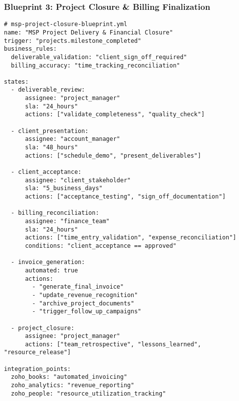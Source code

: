 \subsubsection{Blueprint 3: Project Closure \& Billing Finalization}
\begin{verbatim}
# msp-project-closure-blueprint.yml
name: "MSP Project Delivery & Financial Closure"
trigger: "projects.milestone_completed"
business_rules:
  deliverable_validation: "client_sign_off_required"
  billing_accuracy: "time_tracking_reconciliation"
  
states:
  - deliverable_review:
      assignee: "project_manager"
      sla: "24_hours"
      actions: ["validate_completeness", "quality_check"]
      
  - client_presentation:
      assignee: "account_manager"
      sla: "48_hours"
      actions: ["schedule_demo", "present_deliverables"]
      
  - client_acceptance:
      assignee: "client_stakeholder"
      sla: "5_business_days"
      actions: ["acceptance_testing", "sign_off_documentation"]
      
  - billing_reconciliation:
      assignee: "finance_team"
      sla: "24_hours"
      actions: ["time_entry_validation", "expense_reconciliation"]
      conditions: "client_acceptance == approved"
      
  - invoice_generation:
      automated: true
      actions:
        - "generate_final_invoice"
        - "update_revenue_recognition"
        - "archive_project_documents"
        - "trigger_follow_up_campaigns"
        
  - project_closure:
      assignee: "project_manager"
      actions: ["team_retrospective", "lessons_learned", "resource_release"]

integration_points:
  zoho_books: "automated_invoicing"
  zoho_analytics: "revenue_reporting"
  zoho_people: "resource_utilization_tracking"
\end{verbatim} 